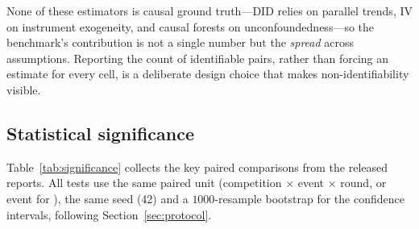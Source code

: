 None of these estimators is causal ground truth---DID relies on parallel
trends, IV on instrument exogeneity, and causal forests on unconfoundedness---so
the benchmark's contribution is not a single number but the \emph{spread}
across assumptions. Reporting the count of identifiable pairs, rather than
forcing an estimate for every cell, is a deliberate design choice that makes
non-identifiability visible.

\subsection{Statistical significance}
\label{sec:results-significance}

Table~\ref{tab:significance} collects the key paired comparisons from the
released reports. All tests use the same paired unit (competition $\times$ event
$\times$ round, or event for ), the same seed (42) and a $1000$-resample
bootstrap for the confidence intervals, following Section~\ref{sec:protocol}.

